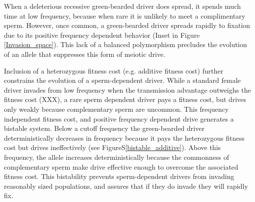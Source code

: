 \documentclass[12pt,letterpaper]{article}
\begin{document}
When a deleterious recessive green-bearded driver does spread, 
	it spends much time at low frequency, because when rare it is unlikely to meet a complimentary sperm. 
However, once common, a green-bearded driver spreads rapidly to fixation due to its
	positive frequency dependent behavior (Inset in Figure \ref{Invasion_space}).  
This lack of a balanced polymorphism precludes the evolution of an allele that suppresses this form of meiotic drive.




Inclusion of a heterozygous fitness cost (e.g. additive fitness cost) further constrains the evolution of a sperm-dependent driver. 
While a  standard female  driver invades from low frequency when the transmission advantage outweighs the fitness cost (XXX),
	a rare sperm dependent driver pays a fitness cost, but drives only weakly because complementary sperm are uncommon. 
This frequency independent fitness cost, and positive frequency dependent drive generates a bistable system. 
Below a cutoff frequency the green-bearded driver deterministically decreases in frequency 
	because it pays the  heterozygous fitness cost  but drives ineffectively (see FigureS\ref{bistable_additive}). 
Above this frequency, the allele increases deterministically because the commonness of complementary sperm 
	make drive effective enough to overcome the associated fitness cost.
This bistability prevents sperm-dependent drivers from invading 	
	reasonably sized populations, and assures that if they do invade they will rapidly fix.
\end{document}
